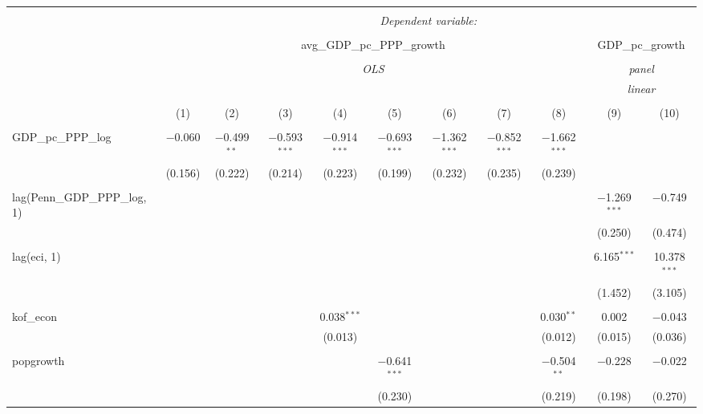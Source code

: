 
\begin{tabular}{@{\extracolsep{5pt}}lcccccccccc} 
\\[-1.8ex]\hline 
\hline \\[-1.8ex] 
 & \multicolumn{10}{c}{\textit{Dependent variable:}} \\ 
\cline{2-11} 
\\[-1.8ex] & \multicolumn{8}{c}{avg\_GDP\_pc\_PPP\_growth} & \multicolumn{2}{c}{GDP\_pc\_growth} \\ 
\\[-1.8ex] & \multicolumn{8}{c}{\textit{OLS}} & \multicolumn{2}{c}{\textit{panel}} \\ 
 & \multicolumn{8}{c}{\textit{}} & \multicolumn{2}{c}{\textit{linear}} \\ 
\\[-1.8ex] & (1) & (2) & (3) & (4) & (5) & (6) & (7) & (8) & (9) & (10)\\ 
\hline \\[-1.8ex] 
 GDP\_pc\_PPP\_log & $-$0.060 & $-$0.499$^{**}$ & $-$0.593$^{***}$ & $-$0.914$^{***}$ & $-$0.693$^{***}$ & $-$1.362$^{***}$ & $-$0.852$^{***}$ & $-$1.662$^{***}$ &  &  \\ 
  & (0.156) & (0.222) & (0.214) & (0.223) & (0.199) & (0.232) & (0.235) & (0.239) &  &  \\ 
  & & & & & & & & & & \\ 
 lag(Penn\_GDP\_PPP\_log, 1) &  &  &  &  &  &  &  &  & $-$1.269$^{***}$ & $-$0.749 \\ 
  &  &  &  &  &  &  &  &  & (0.250) & (0.474) \\ 
  & & & & & & & & & & \\ 
 lag(eci, 1) &  &  &  &  &  &  &  &  & 6.165$^{***}$ & 10.378$^{***}$ \\ 
  &  &  &  &  &  &  &  &  & (1.452) & (3.105) \\ 
  & & & & & & & & & & \\ 
 kof\_econ &  &  &  & 0.038$^{***}$ &  &  &  & 0.030$^{**}$ & 0.002 & $-$0.043 \\ 
  &  &  &  & (0.013) &  &  &  & (0.012) & (0.015) & (0.036) \\ 
  & & & & & & & & & & \\ 
 popgrowth &  &  &  &  & $-$0.641$^{***}$ &  &  & $-$0.504$^{**}$ & $-$0.228 & $-$0.022 \\ 
  &  &  &  &  & (0.230) &  &  & (0.219) & (0.198) & (0.270) \\ 

\end{tabular}
